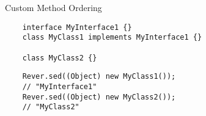 \documentclass[13pt]{beamer}
\begin{document}
\begin{frame}[fragile]{Custom Method Ordering}
  
  \begin{verbatim}
    interface MyInterface1 {}
    class MyClass1 implements MyInterface1 {}
    
    class MyClass2 {}
  \end{verbatim}

  \vspace{5mm} %

  \begin{verbatim}
    Rever.sed((Object) new MyClass1());
    // "MyInterface1"
    Rever.sed((Object) new MyClass2());
    // "MyClass2"
  \end{verbatim}
\end{frame}
\end{document}
